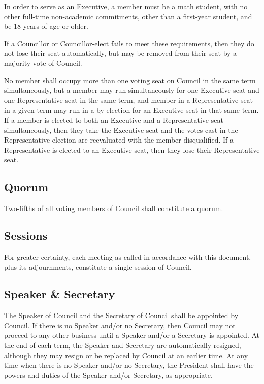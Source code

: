 In order to serve as an Executive, a member must be a math student, with no
other full-time non-academic commitments, other than a first-year student, and
be 18 years of age or older.

If a Councillor or Councillor-elect fails to meet these requirements, then they
do not lose their seat automatically, but may be removed from their seat by a
majority vote of Council.

No member shall occupy more than one voting seat on Council in the same term
simultaneously, but a member may run simultaneously for one Executive seat and
one Representative seat in the same term, and member in a Representative seat in
a given term may run in a by-election for an Executive seat in that same term.
If a member is elected to both an Executive and a Representative seat
simultaneously, then they take the Executive seat and the votes cast in the
Representative election are reevaluated with the member disqualified. If a
Representative is elected to an Executive seat, then they lose their
Representative seat.

\subsection{Quorum}
Two-fifths of all voting members of Council shall constitute a quorum.

\subsection{Sessions}
For greater certainty, each meeting as called in accordance with this document,
plus its adjournments, constitute a single session of Council.

\subsection{Speaker \& Secretary}
The Speaker of Council and the Secretary of Council shall be appointed by
Council. If there is no Speaker and/or no Secretary, then Council may not proceed to
any other business until a Speaker and/or a Secretary is appointed.  At the end of
each term, the Speaker and Secretary are automatically resigned, although they
may resign or be replaced by Council at an earlier time. At any time when there
is no Speaker and/or no Secretary, the President shall have the powers and
duties of the Speaker and/or Secretary, as appropriate.

